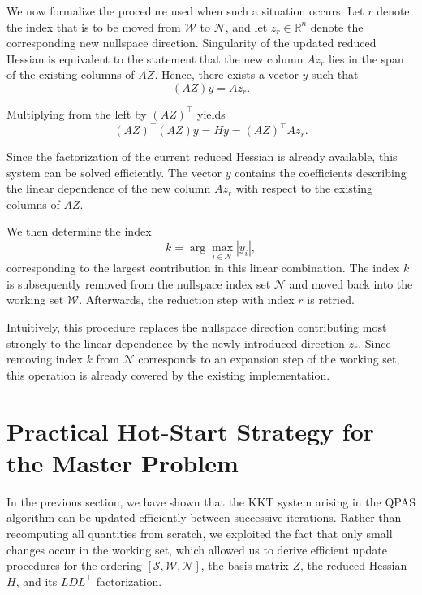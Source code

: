 \documentclass{book}
\theoremstyle{definition}
\newcounter{algorithm_}
\numberwithin{algorithm_}{chapter}
\begin{document}
{We now formalize the procedure used when such a situation occurs. Let \(r\) denote the index that is to be moved from \(\mathcal{W}\) to \(\mathcal{N}\), and let \(z_r \in \mathbb{R}^n\) denote the corresponding new nullspace direction. Singularity of the updated reduced Hessian is equivalent to the statement that the new column \(Az_r\) lies in the span of the existing columns of \(AZ\). Hence, there exists a vector \(y\) such that
\[
(AZ) y = Az_r.
\]

Multiplying from the left by \((AZ)^\top\) yields
\[
(AZ)^\top (AZ) y = H y = (AZ)^\top Az_r.
\]

Since the factorization of the current reduced Hessian is already available, this system can be solved efficiently. The vector \(y\) contains the coefficients describing the linear dependence of the new column \(Az_r\) with respect to the existing columns of \(AZ\).

We then determine the index
\[
k = \arg\max_{i \in \mathcal{N}} |y_i|,
\]
corresponding to the largest contribution in this linear combination. The index \(k\) is subsequently removed from the nullspace index set \(\mathcal{N}\) and moved back into the working set \(\mathcal{W}\). Afterwards, the reduction step with index \(r\) is retried.

Intuitively, this procedure replaces the nullspace direction contributing most strongly to the linear dependence by the newly introduced direction \(z_r\). Since removing index \(k\) from \(\mathcal{N}\) corresponds to an expansion step of the working set, this operation is already covered by the existing implementation.















\newpage

\section{Practical Hot-Start Strategy for the Master Problem}
\label{sec:hotstart}

In the previous section, we have shown that the KKT system arising in the QPAS algorithm can be updated efficiently between successive iterations. Rather than recomputing all quantities from scratch, we exploited the fact that only small changes occur in the working set, which allowed us to derive efficient update procedures for the ordering $[\mathcal{S}, \mathcal{W}, \mathcal{N}]$, the basis matrix $Z$, the reduced Hessian $H$, and its $LDL^\top$ factorization.

}
\end{document}
